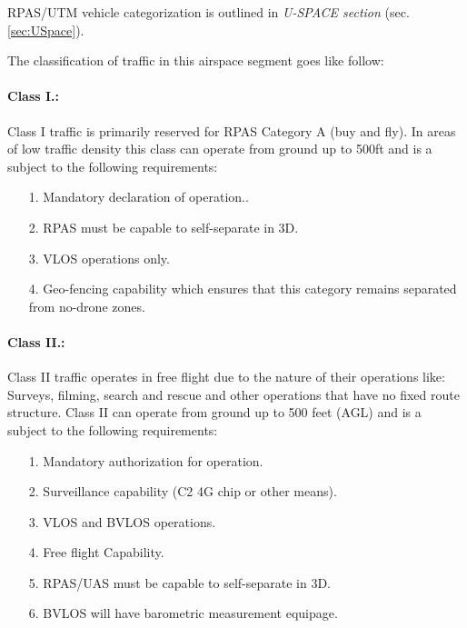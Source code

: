 \begin{note}
    RPAS/UTM vehicle categorization is outlined in \emph{U-SPACE section} (sec. \ref{sec:USpace}).
\end{note}

\noindent The classification of traffic in this airspace segment goes like follow:


\paragraph{Class I.:} Class I traffic is primarily reserved for RPAS Category A (buy and fly). In areas of low traffic density this class can operate from ground up to 500ft and is a subject to the following requirements:
    \begin{itemize}
        \item[1.]  Mandatory declaration of operation..
        
        \item[2.]  RPAS must be capable to self-separate in 3D.
        
        \item[3.]  VLOS operations only.
        
        \item[4.]  Geo-fencing capability which ensures that this category remains separated from no-drone zones.
    \end{itemize}
    
\paragraph{Class II.:} Class II traffic operates in free flight due to the nature of their operations like: Surveys, filming, search and rescue and other operations that have no fixed route structure. Class II can operate from ground up to 500 feet (AGL) and is a subject to the following requirements:
    \begin{itemize}
        \item[1.] Mandatory authorization for operation.
        
        \item[2.] Surveillance capability (C2 4G chip or other means).
        
        \item[3.] VLOS and BVLOS operations.
        
        \item[4.]  Free flight Capability.
        
        \item[5.]  RPAS/UAS must be capable to self-separate in 3D.
        
        \item[6.]  BVLOS will have barometric measurement equipage.
    \end{itemize}
    
